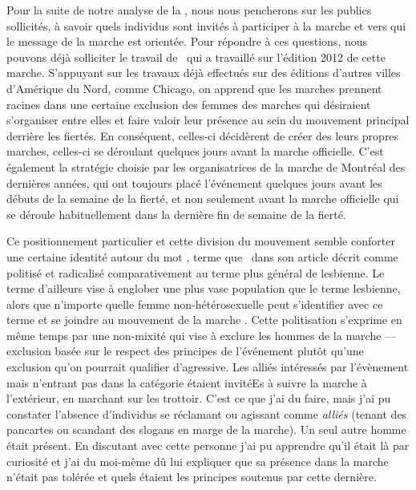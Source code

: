Pour la suite de notre analyse de la \dm{}, nous nous pencherons sur les publics sollicités, à savoir quels individus sont invités à participer à la marche et vers qui le message de la marche est orientée. 
Pour répondre à ces questions, nous pouvons déjà solliciter le travail de~\cite{Podmore2015a} qui a travaillé sur l'édition 2012 de cette marche. 
S'appuyant sur les travaux déjà effectués sur des éditions d'autres villes d'Amérique du Nord, comme Chicago, on apprend que les marches \dykes{} prennent racines dans une certaine exclusion des femmes des marches qui désiraient s'organiser entre elles et faire valoir leur présence au sein du mouvement principal derrière les fiertés. 
En conséquent, celles-ci décidèrent de créer des leurs propres marches, celles-ci se déroulant quelques jours avant la marche officielle. 
C'est également la stratégie choisie par les organisatrices de la marche de Montréal des dernières années, qui ont toujours placé l'événement quelques jours avant les débuts de la semaine de la fierté, et non seulement avant la marche officielle qui se déroule habituellement dans la dernière fin de semaine de la fierté.

Ce positionnement particulier et cette division du mouvement semble conforter une certaine identité autour du mot \dyke{}, terme que~\citet{Podmore2015a} dans son article  décrit comme politisé et radicalisé comparativement au terme plus général de lesbienne. 
Le terme \dyke{} d'ailleurs vise à englober une plus vase population que le terme lesbienne, alors que n'importe quelle femme non-hétérosexuelle peut s'identifier avec ce terme et se joindre au mouvement de la marche \dyke{}. 
Cette politisation s'exprime en même temps par une non-mixité qui vise à exclure les hommes de la marche --- exclusion basée sur le respect des principes de l'événement plutôt qu'une exclusion qu'on pourrait qualifier d'agressive. 
Les alliés intéressés par l'évènement mais n'entrant pas dans la catégorie \dyke{} étaient invitéEs à suivre la marche à l'extérieur, en marchant sur les trottoir. 
C'est ce que j'ai du faire, mais j'ai pu constater l'absence d'individus se réclamant ou agissant comme \emph{alliés} (tenant des pancartes ou scandant des slogans en marge de la marche). 
Un seul autre homme était présent. 
En discutant avec cette personne j'ai pu apprendre qu'il était là par curiosité et j'ai du moi-même dû lui expliquer que sa présence dans la marche n'était pas tolérée et quels étaient les principes soutenus par cette dernière.

